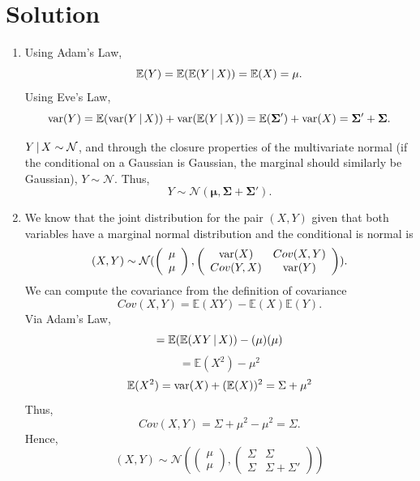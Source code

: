 \documentclass[submit]{harvardml}
\newcommand{\E}{\mathbb{E}}
\renewcommand{\v}[1]{\mathbf{#1}}
\begin{document}
\section*{Solution}

\begin{enumerate}[label=(\alph*)]
    \item Using Adam's Law,\[\E(Y) = \E(\E(Y \given X)) = \E(X) = \v \mu.\] Using Eve's Law,\[\var(Y) = \E(\var(Y \given X)) + \var(\E(Y \given X)) = \E(\v \Sigma') + \var(X) = \v \Sigma' + \v \Sigma.\]
    
    $Y \,|\, X \sim \mathcal{N}$, and through the closure properties of the multivariate normal (if the conditional on a Gaussian is Gaussian, the marginal should similarly be Gaussian), $Y \sim \mathcal{N}$. Thus,\[Y \sim \mathcal{N}(\v \mu,\v \Sigma + \v \Sigma').\]
    
    \item We know that the joint distribution for the pair $(X,Y)$ given that both variables have a marginal normal distribution and the conditional is normal is \[(X,Y) \sim \mathcal{N}(\left( \begin{array}{c} \mu \\ \mu \end{array} \right),\left( \begin{array}{cc} \mathrm{var}(X) & Cov(X,Y) \\ Cov(Y,X) & \mathrm{var}(Y) \end{array} \right)).\] We can compute the covariance from the definition of covariance \[Cov(X,Y) = \E(XY) - \E(X)\E(Y).\] Via Adam's Law,\[= \E(\E(XY \given X)) - (\mu)(\mu)\]\[= \E(X^2) - \mu^2\]\[\E(X^2) = \var(X) + (\E(X))^2 = \Sigma + \mu^2\] Thus,\[Cov(X,Y) = \Sigma + \mu^2 - \mu^2 = \Sigma.\] Hence,\[(X,Y) \sim \mathcal{N}(\left( \begin{array}{c} \mu \\ \mu \end{array} \right),\left( \begin{array}{cc} \Sigma & \Sigma \\ \Sigma & \Sigma + \Sigma' \end{array} \right))\]
\end{enumerate}

\newpage
\end{document}

